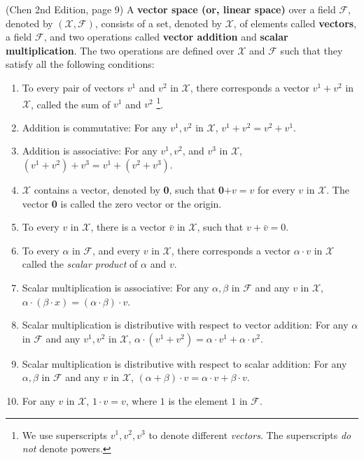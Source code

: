 \begin{definition} (Chen 2nd Edition, page 9) A \textbf{vector space (or, linear space)} over a field $\mathcal{F}$, denoted by $\left(\mathcal{X},\mathcal{F}\right)$, consists of a set, denoted by $\mathcal{X}$, of elements called \textbf{vectors}, a field $\mathcal{F}$, and two operations called \textbf{vector addition} and \textbf{scalar multiplication}. The two operations are defined over $\mathcal{X}$ and $\mathcal{F}$ such that they satisfy all the following conditions:
    \begin{enumerate}
        \item To every pair of vectors $v^1$ and $v^2$ in $\mathcal{X}$, there corresponds a vector $v^1+v^2$ in $\mathcal{X}$, called the sum of $v^1$ and $v^2$ \footnote{We use superscripts $v^1, v^2, v^3$ to denote different \emph{vectors}. The superscripts \emph{do not} denote powers.}.
        \item Addition is commutative: For any $v^1,v^2$ in $\mathcal{X}$, $v^1+v^2 = v^2+v^1$.
        \item Addition is associative: For any $v^1,v^2$, and $v^3$ in $\mathcal{X}$, $\left(v^1+v^2\right)+v^3 = v^1 + \left(v^2+v^3\right)$.
        \item $\mathcal{X}$ contains a vector, denoted by \textbf{0}, such that \textbf{0}$ + v = v$ for every $v$ in $\mathcal{X}$. The vector \textbf{0} is called the zero vector or the origin.
        \item To every $v$ in $\mathcal{X}$, there is a vector $\bar v$ in $\mathcal{X}$, such that $v + \bar v = 0$.
        \item To every $\alpha$ in $\mathcal{F}$, and every $v$ in $\mathcal{X}$, there corresponds a vector $\alpha\cdot v$ in $\mathcal{X}$ called the \emph{scalar product} of $\alpha$ and $v$.
        \item Scalar multiplication is associative: For any $\alpha, \beta$ in $\mathcal{F}$ and any $v$ in $\mathcal{X}$, $\alpha\cdot\left(\beta\cdot x\right) = \left(\alpha\cdot\beta\right)\cdot v$.
        \item Scalar multiplication is distributive with respect to vector addition: For any $\alpha$ in $\mathcal{F}$ and any $v^1,v^2$ in $\mathcal{X}$, $\alpha\cdot\left(v^1+v^2\right) = \alpha\cdot v^1 + \alpha\cdot v^2$.
        \item Scalar multiplication is distributive with respect to scalar addition: For any $\alpha ,\beta$ in $\mathcal{F}$ and any $v$ in $\mathcal{X}$, $\left(\alpha+\beta\right)\cdot v = \alpha\cdot v + \beta\cdot v$.
        \item For any $v$ in $\mathcal{X}$, $1\cdot v=v$, where $1$ is the element $1$ in $\mathcal{F}$.
    \end{enumerate}
        
\end{definition} 

